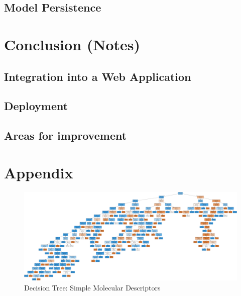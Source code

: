 \documentclass[a4paper,12pt]{report}
\begin{document}
	\section{Model Persistence} 
		
		


\chapter{Conclusion (Notes)}
	\section{Integration into a Web Application}
	\section{Deployment}
	\section{Areas for improvement}



\chapter*{Appendix}
\begin{figure}[H]
	\centering
	\includegraphics[width=\textwidth,scale=1,height=\textheight]{images/bbb_tree_smd}
	\caption{Decision Tree: Simple Molecular Descriptors}
	\label{fig:bbb_tree_smd_large}
\end{figure}




\end{document}
